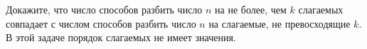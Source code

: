 Докажите, что число способов разбить число $n$ на не более, чем $k$ слагаемых совпадает с числом способов
разбить число $n$ на слагаемые, не превосходящие $k$. В этой задаче порядок слагаемых не имеет значения.
